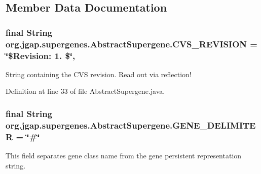 \subsection{Member Data Documentation}
\hypertarget{classorg_1_1jgap_1_1supergenes_1_1_abstract_supergene_a9084146c063a12faff254011968f40b8}{
\subsubsection[{C\-V\-S\-\_\-\-R\-E\-V\-I\-S\-I\-O\-N}]{\setlength{\rightskip}{0pt plus 5cm}final String org.\-jgap.\-supergenes.\-Abstract\-Supergene.\-C\-V\-S\-\_\-\-R\-E\-V\-I\-S\-I\-O\-N = \char`\"{}\$Revision\-: 1. \$\char`\"{}\hspace{0.3cm}{\ttfamily [static]}, {\ttfamily [private]}}}\label{classorg_1_1jgap_1_1supergenes_1_1_abstract_supergene_a9084146c063a12faff254011968f40b8}
String containing the C\-V\-S revision. Read out via reflection! 

Definition at line 33 of file Abstract\-Supergene.\-java.

\hypertarget{classorg_1_1jgap_1_1supergenes_1_1_abstract_supergene_ae7be27a291a2aa7e594384dd7a5936a8}{
\subsubsection[{G\-E\-N\-E\-\_\-\-D\-E\-L\-I\-M\-I\-T\-E\-R}]{\setlength{\rightskip}{0pt plus 5cm}final String org.\-jgap.\-supergenes.\-Abstract\-Supergene.\-G\-E\-N\-E\-\_\-\-D\-E\-L\-I\-M\-I\-T\-E\-R = \char`\"{}\#\char`\"{}\hspace{0.3cm}{\ttfamily [static]}}}\label{classorg_1_1jgap_1_1supergenes_1_1_abstract_supergene_ae7be27a291a2aa7e594384dd7a5936a8}
This field separates gene class name from the gene persistent representation string. 

